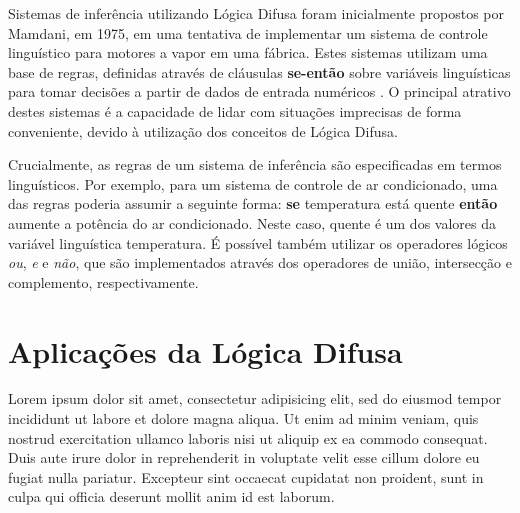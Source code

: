 \documentclass[12pt]{article}
\begin{document}
Sistemas de inferência utilizando Lógica Difusa foram inicialmente propostos por Mamdani, em 1975, em uma tentativa de implementar um sistema de controle linguístico para motores a vapor em uma fábrica. Estes sistemas utilizam uma base de regras, definidas através de cláusulas \textbf{se-então} sobre variáveis linguísticas para tomar decisões a partir de dados de entrada numéricos \cite{Mamdani1975}. O principal atrativo destes sistemas é a capacidade de lidar com situações imprecisas de forma conveniente, devido à utilização dos conceitos de Lógica Difusa.

Crucialmente, as regras de um sistema de inferência são especificadas em termos linguísticos. Por exemplo, para um sistema de controle de ar condicionado, uma das regras poderia assumir a seguinte forma: \textbf{se} temperatura está quente \textbf{então} aumente a potência do ar condicionado. Neste caso, quente é um dos valores da variável linguística temperatura. É possível também utilizar os operadores lógicos \textit{ou}, \textit{e} e \textit{não}, que são implementados através dos operadores de união, intersecção e complemento, respectivamente.

\section{Aplicações da Lógica Difusa} \label{sec:applications}

Lorem ipsum dolor sit amet, consectetur adipisicing elit, sed do eiusmod tempor incididunt ut labore et dolore magna aliqua. Ut enim ad minim veniam, quis nostrud exercitation ullamco laboris nisi ut aliquip ex ea commodo consequat. Duis aute irure dolor in reprehenderit in voluptate velit esse cillum dolore eu fugiat nulla pariatur. Excepteur sint occaecat cupidatat non proident, sunt in culpa qui officia deserunt mollit anim id est laborum.



\end{document}
